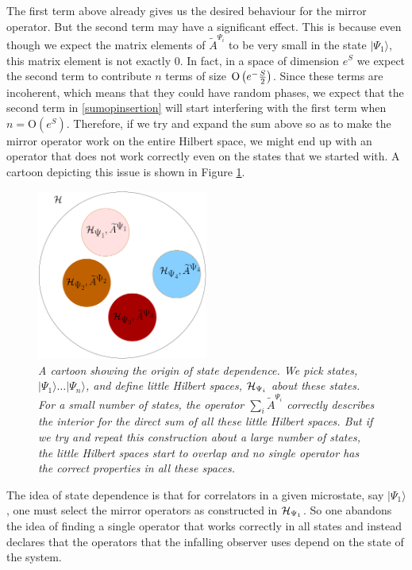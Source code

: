 \documentclass[12pt]{article}
\newcommand{\cop}[1]{#1}
\newcommand{\al}{\cop{A}} %
\def\tal{\widetilde{\al}} %
\def\hilb[#1]{{\cal H}_{#1}}
\def\Or[#1]{{\text{O}}\left({#1}\right)}
\begin{document}
The first term above already gives us the desired behaviour for the mirror operator. But the second term may have a significant effect. This is because even though we expect the matrix elements of $\tal^{\Psi_i}$ to be very small in the state $|\Psi_1 \rangle$, this matrix element is not exactly 0. In fact, in a space of dimension $e^{S}$ we expect the second term to contribute $n$ terms of size $\Or[e^{-{S \over 2}}]$. Since these terms are incoherent, which means that they could have random phases, we expect that the second term in \eqref{sumopinsertion} will start interfering with the first term when  $n = \Or[e^{S}]$.  Therefore, if we try and  expand the sum above so as to make the mirror operator work on the entire Hilbert space, we might end up with an operator that does not work correctly even on the states that we started with. A cartoon depicting this issue is shown in Figure \ref{multihpsi}.
\begin{figure}[!ht]
\begin{center}
\includegraphics[width=0.5\textwidth]{multihpsinewwithto.pdf}
\caption{\em A cartoon showing the origin of state dependence. We pick states, $|\Psi_1 \rangle \ldots |\Psi_n \rangle$, and define little Hilbert spaces, ${\cal H}_{\Psi_i}$  about these states. For a small number of states, the operator $\sum_i \tal^{\Psi_i}$ correctly describes the interior for the direct sum of all these little Hilbert spaces. But if we try and repeat this construction about a large number of states, the little Hilbert spaces start to overlap and no single operator has the correct properties in all these spaces. \label{multihpsi}}
\end{center}
\end{figure}

The idea of state dependence is that for correlators in a given microstate, say $|\Psi_1 \rangle$, one must select the mirror operators as constructed in $\hilb[\Psi_1]$. So one abandons the idea of finding a single operator that works correctly in all states and instead declares that the operators that the infalling observer uses depend on the state of the system.
\end{document}
